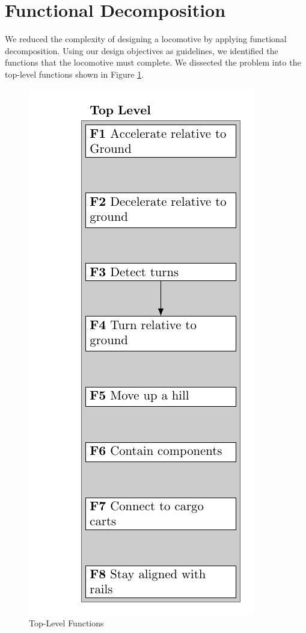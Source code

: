 \documentclass[class=../report, crop=false]{standalone}
\begin{document}
\section{Functional Decomposition}

We reduced the complexity of designing a locomotive by applying functional decomposition.
Using our design objectives as guidelines, we identified the functions that the locomotive must complete.
We dissected the problem into the top-level functions shown in Figure \ref{fig:toplevel}.

\begin{figure}[h]
	\centering
	\includegraphics{../../bin/toplevel.pdf}
	\caption{Top-Level Functions}
	\label{fig:toplevel}
\end{figure}
\end{document}
